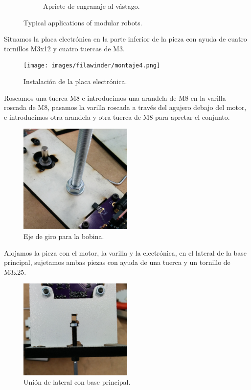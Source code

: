 \begin{figure}[h]
\begin{subfigure}[b]{0.35\textwidth}
                \caption{Apriete de engranaje al vástago.}
                \label{fig:winder_apriete}
        \end{subfigure}
        \caption{Typical applications of modular robots.}
        \label{fig:winder_montaje_engranaje}
\end{figure}

Situamos la placa electrónica en la parte inferior de la pieza con ayuda de cuatro tornillos M3x12 y cuatro tuercas de M3.

    \begin{figure}[H]
            \centering
            \texttt{[image: images/filawinder/montaje4.png]}
            \caption{Instalación de la placa electrónica.}
            \label{fig:winder_arduino}
    \end{figure}

Roscamos una tuerca M8 e introducimos una arandela de M8 en la varilla roscada de M8, pasamos la varilla roscada a través del agujero debajo del motor, e introducimos otra arandela y otra tuerca de M8 para apretar el conjunto.

    \begin{figure}[H]
            \centering
            \includegraphics[width=0.5\textwidth]{images/filawinder/montaje5.png}
            \caption{Eje de giro para la bobina.}
            \label{fig:winder_soporte}
    \end{figure}

Alojamos la pieza con el motor, la varilla y la electrónica, en el lateral de la base principal, sujetamos ambas piezas con ayuda de una tuerca y un tornillo de M3x25.

    \begin{figure}[H]
            \centering
            \includegraphics[width=0.5\textwidth]{images/filawinder/montaje6.png}
            \caption{Unión de lateral con base principal.}
            \label{fig:winder_soporte_base}
    \end{figure}